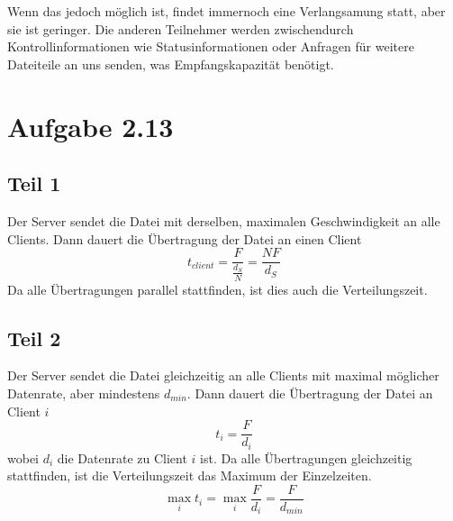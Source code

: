 \documentclass[10pt,a4paper]{article}
\begin{document}
Wenn das jedoch möglich ist, findet immernoch eine Verlangsamung statt, aber sie
ist geringer. Die anderen Teilnehmer werden zwischendurch Kontrollinformationen
wie Statusinformationen oder Anfragen für weitere Dateiteile an uns senden, was
Empfangskapazität benötigt.

\section{Aufgabe 2.13}

\subsection{Teil 1}

Der Server sendet die Datei mit derselben, maximalen Geschwindigkeit an alle
Clients. Dann dauert die Übertragung der Datei an einen Client
\begin{equation}
  t_{client} = \frac{F}{\frac{d_{S}}{N}} = \frac{NF}{d_{S}}
\end{equation}
Da alle Übertragungen parallel stattfinden, ist dies auch die Verteilungszeit.

\subsection{Teil 2}

Der Server sendet die Datei gleichzeitig an alle Clients mit maximal möglicher
Datenrate, aber mindestens $d_{min}$. Dann dauert die Übertragung der Datei an
Client $i$
\begin{equation}
  t_{i} = \frac{F}{d_{i}}
\end{equation}
wobei $d_{i}$ die Datenrate zu Client $i$ ist. Da alle Übertragungen
gleichzeitig stattfinden, ist die Verteilungszeit das Maximum der Einzelzeiten.
\begin{equation}
  \max_{i} t_{i} = \max_{i} \frac{F}{d_{i}} = \frac{F}{d_{min}}
\end{equation}
\end{document}
